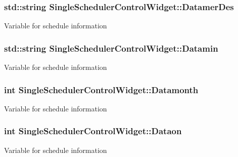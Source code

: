 \subsubsection[{\texorpdfstring{Datamer\+Des}{DatamerDes}}]{\setlength{\rightskip}{0pt plus 5cm}std\+::string Single\+Scheduler\+Control\+Widget\+::\+Datamer\+Des\hspace{0.3cm}{\ttfamily [private]}}\hypertarget{classSingleSchedulerControlWidget_a13ced62f55d57453da0a2f673e52d5d5}{}\label{classSingleSchedulerControlWidget_a13ced62f55d57453da0a2f673e52d5d5}
Variable for schedule information 
\subsubsection[{\texorpdfstring{Datamin}{Datamin}}]{\setlength{\rightskip}{0pt plus 5cm}std\+::string Single\+Scheduler\+Control\+Widget\+::\+Datamin\hspace{0.3cm}{\ttfamily [private]}}\hypertarget{classSingleSchedulerControlWidget_abb4a09ba0ce3ad37119bd0a13eb1979a}{}\label{classSingleSchedulerControlWidget_abb4a09ba0ce3ad37119bd0a13eb1979a}
Variable for schedule information 
\subsubsection[{\texorpdfstring{Datamonth}{Datamonth}}]{\setlength{\rightskip}{0pt plus 5cm}int Single\+Scheduler\+Control\+Widget\+::\+Datamonth\hspace{0.3cm}{\ttfamily [private]}}\hypertarget{classSingleSchedulerControlWidget_acf568679a63621149ab2212944241684}{}\label{classSingleSchedulerControlWidget_acf568679a63621149ab2212944241684}
Variable for schedule information 
\subsubsection[{\texorpdfstring{Dataon}{Dataon}}]{\setlength{\rightskip}{0pt plus 5cm}int Single\+Scheduler\+Control\+Widget\+::\+Dataon\hspace{0.3cm}{\ttfamily [private]}}\hypertarget{classSingleSchedulerControlWidget_a2ba1dcbf2d85d36401dfa444f8419e76}{}\label{classSingleSchedulerControlWidget_a2ba1dcbf2d85d36401dfa444f8419e76}
Variable for schedule information 
